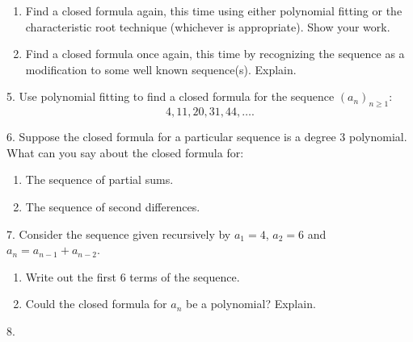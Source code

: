 \documentclass[10pt,]{book}
\theoremstyle{plain}
\theoremstyle{definition}
\numberwithin{equation}{chapter}
\begin{document}
\begin{exerciselist}
\begin{enumerate}[label=(\alph*)]
\item\hypertarget{li-600}{}
                Find a closed formula again, this time using either polynomial fitting or the characteristic root technique (whichever is appropriate). Show your work.



\item\hypertarget{li-601}{}
                Find a closed formula once again, this time by recognizing the sequence as a modification to some well known sequence(s). Explain.


\end{enumerate}
\par\smallskip
\item[5.]\hypertarget{exercise-213}{}
            Use polynomial fitting to find a closed formula for the sequence \((a_n)_{n\ge 1}\):
            \begin{equation*}4, 11, 20, 31, 44, \ldots.\end{equation*}
\par\smallskip
\item[6.]\hypertarget{exercise-214}{}
            Suppose the closed formula for a particular sequence is a degree 3 polynomial. What can you say about the closed formula for:
\leavevmode%
\begin{enumerate}[label=(\alph*)]
\item\hypertarget{li-602}{}
                The sequence of partial sums.
\item\hypertarget{li-603}{}
                The sequence of second differences.
\end{enumerate}
\par\smallskip
\item[7.]\hypertarget{exercise-215}{}
            Consider the sequence given recursively by \(a_1 = 4\), \(a_2 = 6\) and \(a_n = a_{n-1} + a_{n-2}\).
\leavevmode%
\begin{enumerate}[label=(\alph*)]
\item\hypertarget{li-606}{}
                Write out the first 6 terms of the sequence.
\item\hypertarget{li-607}{}
                Could the closed formula for \(a_n\) be a polynomial? Explain.
\end{enumerate}
\par\smallskip
\item[8.]\hypertarget{exercise-216}{}

\end{exerciselist}
\end{document}
